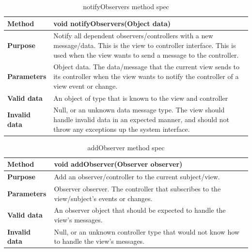 \documentclass[12pt]{article}
\begin{document}
\begin{table}[H]
  \caption{notifyObservers method spec}
  \begin{center}
    \begin{tabular}{|l|p{10cm}|}
      \hline
      \bf Method & void notifyObservers(Object data)\\
		\hline
      \bf Purpose &  Notify all dependent observers/controllers with a new message/data. This is the view to controller interface. This is used when the view wants to send a message to the controller.\\
		\hline
      \bf Parameters & Object data. The data/message that the current view sends to its controller when the view wants to notify the controller of a view event or change.\\
		\hline
      \bf Valid data &  An object of type that is known to the view and controller\\
      \hline
      \bf Invalid data & Null, or an unknown data message type. The view should handle invalid data in an expected manner, and should not throw any exceptions up the system interface.\\
      \hline

    \end{tabular}
  \end{center}
\end{table}

\begin{table}[H]
  \caption{addObserver method spec}
  \begin{center}
    \begin{tabular}{|l|p{10cm}|}
      \hline
      \bf Method & void addObserver(Observer observer)\\
		\hline
      \bf Purpose & Add an observer/controller to the current subject/view.\\
		\hline
      \bf Parameters & Observer observer. The controller that subscribes to the view/subject’s events or changes.\\
		\hline
      \bf Valid data & An observer object that should be expected to handle the view’s messages.\\
      \hline
      \bf Invalid data &Null, or an unknown controller type that would not know how to handle the view’s messages.\\
      \hline

    \end{tabular}
  \end{center}
\end{table}
\end{document}
